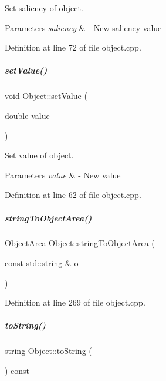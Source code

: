 Set saliency of object. 


\begin{DoxyParams}{Parameters}
{\em saliency} & -\/ New saliency value \\
\hline
\end{DoxyParams}


Definition at line 72 of file object.\+cpp.

\mbox{\label{group__icubclient__representations_a19d56c855f6cc48e8164eb1e9ecf4430}} 
\subparagraph{\texorpdfstring{set\+Value()}{setValue()}}
{\footnotesize\ttfamily void Object\+::set\+Value (\begin{DoxyParamCaption}\item[{double}]{value }\end{DoxyParamCaption})}



Set value of object. 


\begin{DoxyParams}{Parameters}
{\em value} & -\/ New value \\
\hline
\end{DoxyParams}


Definition at line 62 of file object.\+cpp.

\mbox{\label{group__icubclient__representations_a36022118155dfd605b1208a246dce4c3}} 
\subparagraph{\texorpdfstring{string\+To\+Object\+Area()}{stringToObjectArea()}}
{\footnotesize\ttfamily \hyperlink{namespaceicubclient_a582031d3e105cc59d614d15d30d22e65}{Object\+Area} Object\+::string\+To\+Object\+Area (\begin{DoxyParamCaption}\item[{const std\+::string \&}]{o }\end{DoxyParamCaption})\hspace{0.3cm}{\ttfamily [static]}}



Definition at line 269 of file object.\+cpp.

\mbox{\label{group__icubclient__representations_aef5180c43e05c572865ad38ff650b930}} 
\subparagraph{\texorpdfstring{to\+String()}{toString()}}
{\footnotesize\ttfamily string Object\+::to\+String (\begin{DoxyParamCaption}{ }\end{DoxyParamCaption}) const\hspace{0.3cm}{\ttfamily [virtual]}}



